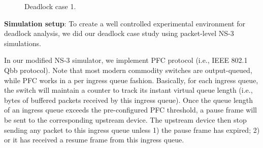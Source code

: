 \begin{figure}[t]

\caption{Deadlock case 1.}\label{fig:case1}

\end{figure}

 \textbf{Simulation setup}: To create a well controlled experimental environment for deadlock analysis, we did our deadlock case study using packet-level NS-3 simulations. 
 
 In our modified NS-3 simulator, we implement PFC protocol (i.e., IEEE 802.1 Qbb protocol). Note that most modern commodity switches are output-queued, while PFC works in a per ingress queue fashion. Basically, for each ingress queue, the switch will maintain a counter to track its instant virtual queue length (i.e., bytes of buffered packets received by this ingress queue). Once the queue length of an ingress queue exceeds the pre-configured PFC threshold, a pause frame will be sent to the corresponding upstream device. The upstream device then stop sending any packet to this ingress queue unless 1) the pause frame has expired; 2) or it has received a resume frame from this ingress queue.
 
